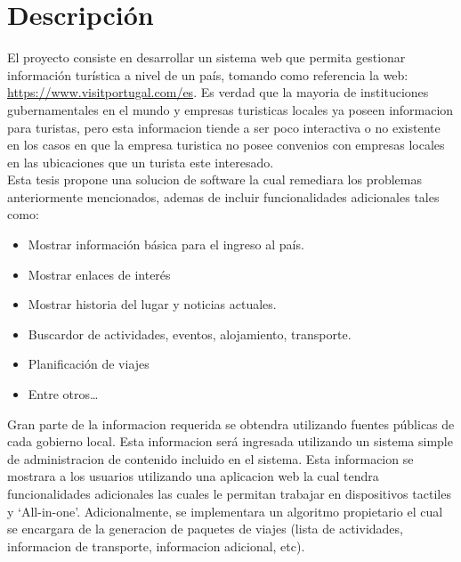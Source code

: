 \documentclass{article}
\begin{document}
\section{Descripción}

El proyecto consiste en desarrollar un sistema web que permita gestionar
información turística a nivel de un país, tomando como referencia la web:
\url{https://www.visitportugal.com/es}. Es verdad que la mayoria de instituciones
gubernamentales en el mundo y empresas turisticas locales ya poseen informacion
para turistas, pero esta informacion tiende a ser poco interactiva o no existente
en los casos en que la empresa turistica no posee convenios con empresas locales
en las ubicaciones que un turista este interesado.\\
Esta tesis propone una solucion de software la cual remediara los problemas
anteriormente mencionados, ademas de incluir funcionalidades adicionales tales como:
\begin{itemize}
    \item{Mostrar información básica para el ingreso al país.}
    \item{Mostrar enlaces de interés}
    \item{Mostrar historia del lugar y noticias actuales.}
    \item{Buscardor de actividades, eventos, alojamiento, transporte.}
    \item{Planificación de viajes}
    \item{Entre otros\ldots{}}
\end{itemize}
Gran parte de la informacion requerida se obtendra utilizando fuentes públicas
de cada gobierno local. Esta informacion será ingresada utilizando un sistema
simple de administracion de contenido incluido en el sistema. Esta informacion
se mostrara a los usuarios utilizando una aplicacion web la cual tendra funcionalidades
adicionales las cuales le permitan trabajar en dispositivos tactiles y `All-in-one'.
Adicionalmente, se implementara un algoritmo propietario el cual se encargara
de la generacion de paquetes de viajes (lista de actividades, informacion de transporte,
informacion adicional, etc).
\end{document}

